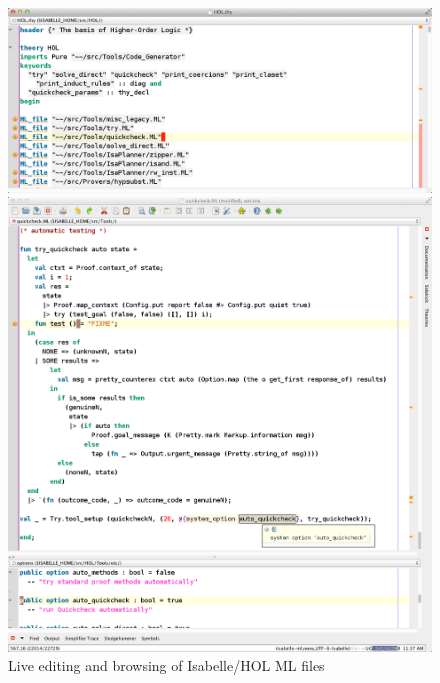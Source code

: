 \begin{isabellebody}
\begin{isamarkuptext}
\begin{figure}[!htbp]
\begin{center}
\includegraphics[scale=0.333]{hol}

\vspace*{1ex}

\includegraphics[scale=0.333]{ml}
\end{center}
\caption{Live editing and browsing of Isabelle/HOL ML files}
\label{fig:ml}
\end{figure}


\end{isamarkuptext}
\end{isabellebody}
